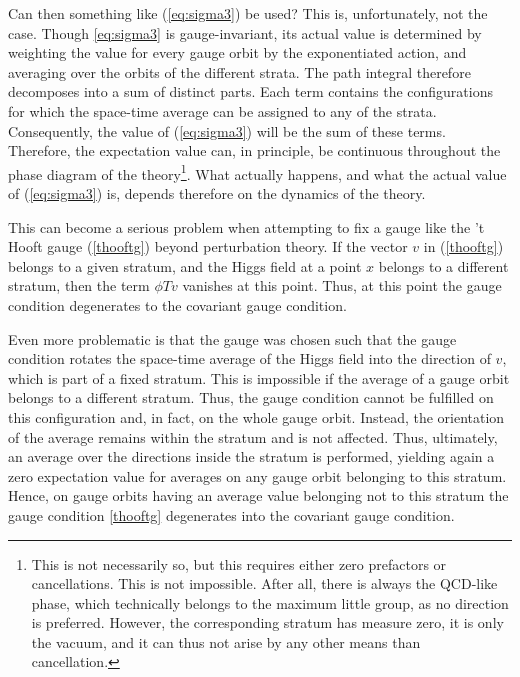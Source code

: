 \documentclass[final,12pt]{article}
\newcommand*{\pref}[1]{(\ref{#1})}
\newcommand*{\1}{1\!\!\!\bot}
\begin{document}
Can then something like \pref{eq:sigma3} be used? This is, unfortunately, not the case. Though \eqref{eq:sigma3} is gauge-invariant, its actual value is determined by weighting the value for every gauge orbit by the exponentiated action, and averaging over the orbits of the different strata. The path integral therefore decomposes into a sum of distinct parts. Each term contains the configurations for which the space-time average can be assigned to any of the strata. Consequently, the value of \pref{eq:sigma3} will be the sum of these terms. Therefore, the expectation value can, in principle, be continuous throughout the phase diagram of the theory\footnote{This is not necessarily so, but this requires either zero prefactors or cancellations. This is not impossible. After all, there is always the QCD-like phase, which technically belongs to the maximum little group, as no direction is preferred. However, the corresponding stratum has measure zero, it is only the vacuum, and it can thus not arise by any other means than cancellation.}. What actually happens, and what the actual value of \pref{eq:sigma3} is, depends therefore on the dynamics of the theory.

This can become a serious problem when attempting to fix a gauge like the 't Hooft gauge \pref{thooftg} beyond perturbation theory. If the vector $v$ in \pref{thooftg} belongs to a given stratum, and the Higgs field at a point $x$ belongs to a different stratum, then the term $\phi T v$ vanishes at this point. Thus, at this point the gauge condition degenerates to the covariant gauge condition.

Even more problematic is that the gauge was chosen such that the gauge condition rotates the space-time average of the Higgs field into the direction of $v$, which is part of a fixed stratum. This is impossible if the average of a gauge orbit belongs to a different stratum. Thus, the gauge condition cannot be fulfilled on this configuration and, in fact, on the whole gauge orbit. Instead, the orientation of the average remains within the stratum and is not affected. Thus, ultimately, an average over the directions inside the stratum is performed, yielding again a zero expectation value for averages on any gauge orbit belonging to this stratum. Hence, on gauge orbits having an average value belonging not to this stratum the gauge condition \eqref{thooftg} degenerates into the covariant gauge condition.
\end{document}
